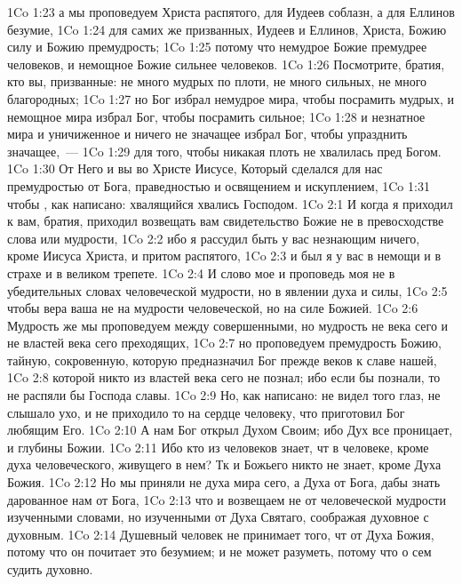 \vs 1Co 1:23 а мы проповедуем Христа распятого, для Иудеев соблазн, а для Еллинов безумие,
\vs 1Co 1:24 для самих же призванных, Иудеев и Еллинов, Христа, Божию силу и Божию премудрость;
\vs 1Co 1:25 потому что немудрое Божие премудрее человеков, и немощное Божие сильнее человеков.
\rsbpar\vs 1Co 1:26 Посмотрите, братия, кто вы, призванные: не много  мудрых по плоти, не много сильных, не много благородных;
\vs 1Co 1:27 но Бог избрал немудрое мира, чтобы посрамить мудрых, и немощное мира избрал Бог, чтобы посрамить сильное;
\vs 1Co 1:28 и незнатное мира и уничиженное и ничего не значащее избрал Бог, чтобы упразднить значащее,~---
\vs 1Co 1:29 для того, чтобы никакая плоть не хвалилась пред Богом.
\vs 1Co 1:30 От Него и вы во Христе Иисусе, Который сделался для нас премудростью от Бога, праведностью и освящением и искуплением,
\vs 1Co 1:31 чтобы , как написано: хвалящийся хвались Господом.
\vs 1Co 2:1 И когда я приходил к вам, братия, приходил возвещать вам свидетельство Божие не в превосходстве слова или мудрости,
\vs 1Co 2:2 ибо я рассудил быть у вас незнающим ничего, кроме Иисуса Христа, и притом распятого,
\vs 1Co 2:3 и был я у вас в немощи и в страхе и в великом трепете.
\vs 1Co 2:4 И слово мое и проповедь моя не в убедительных словах человеческой мудрости, но в явлении духа и силы,
\vs 1Co 2:5 чтобы вера ваша  не на мудрости человеческой, но на силе Божией.
\rsbpar\vs 1Co 2:6 Мудрость же мы проповедуем между совершенными, но мудрость не века сего и не властей века сего преходящих,
\vs 1Co 2:7 но проповедуем премудрость Божию, тайную, сокровенную, которую предназначил Бог прежде веков к славе нашей,
\vs 1Co 2:8 которой никто из властей века сего не познал; ибо если бы познали, то не распяли бы Господа славы.
\vs 1Co 2:9 Но, как написано: не видел того глаз, не слышало ухо, и не приходило то на сердце человеку, что приготовил Бог любящим Его.
\vs 1Co 2:10 А нам Бог открыл  Духом Своим; ибо Дух все проницает, и глубины Божии.
\vs 1Co 2:11 Ибо кто из человеков знает, чт в человеке, кроме духа человеческого, живущего в нем? Тк и Божьего никто не знает, кроме Духа Божия.
\vs 1Co 2:12 Но мы приняли не духа мира сего, а Духа от Бога, дабы знать дарованное нам от Бога,
\vs 1Co 2:13 что и возвещаем не от человеческой мудрости изученными словами, но изученными от Духа Святаго, соображая духовное с духовным.
\vs 1Co 2:14 Душевный человек не принимает того, чт от Духа Божия, потому что он почитает это безумием; и не может разуметь, потому что о сем  судить духовно.
